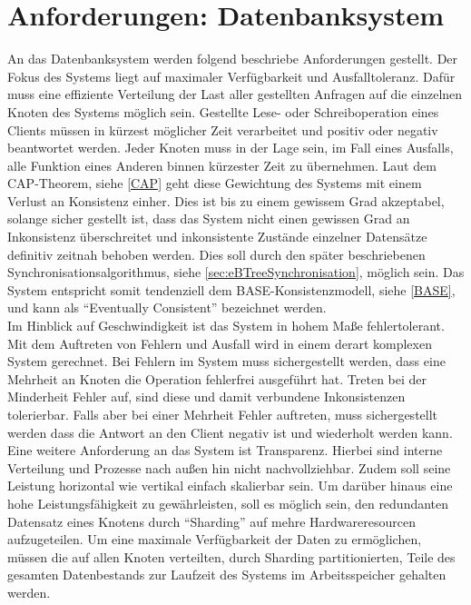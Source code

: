 \documentclass[a4paper,11pt,oneside,%
headsepline,												%
footsepline,												%
bibtotocnumbered									%
]{scrreprt}
\begin{document}
\section{Anforderungen: Datenbanksystem}
An das Datenbanksystem werden folgend beschriebe Anforderungen gestellt. Der Fokus des Systems liegt auf maximaler Verfügbarkeit und Ausfalltoleranz. Dafür muss eine effiziente Verteilung der Last aller gestellten Anfragen auf die einzelnen Knoten des Systems möglich sein. Gestellte Lese- oder Schreiboperation eines Clients müssen in kürzest möglicher Zeit verarbeitet und positiv oder negativ beantwortet werden. Jeder Knoten muss in der Lage sein, im Fall eines Ausfalls, alle Funktion eines Anderen binnen kürzester Zeit zu übernehmen. Laut dem CAP-Theorem, siehe \autoref{CAP} geht diese Gewichtung des Systems mit einem Verlust an Konsistenz einher. Dies ist bis zu einem gewissem Grad akzeptabel, solange sicher gestellt ist, dass das System nicht einen gewissen Grad an Inkonsistenz überschreitet und inkonsistente Zustände einzelner Datensätze definitiv zeitnah behoben werden. Dies soll durch den später beschriebenen Synchronisationsalgorithmus, siehe \autoref{sec:eBTreeSynchronisation}, möglich sein. Das System entspricht somit tendenziell dem BASE-Konsistenzmodell, siehe \autoref{BASE}, und kann als \enquote{Eventually Consistent} bezeichnet werden.\\ 

Im Hinblick auf Geschwindigkeit ist das System in hohem Maße fehlertolerant. Mit dem Auftreten von Fehlern und Ausfall wird in einem derart komplexen System gerechnet. Bei Fehlern im System muss sichergestellt werden, dass eine Mehrheit an Knoten die Operation fehlerfrei ausgeführt hat. Treten bei der Minderheit Fehler auf, sind diese und damit verbundene Inkonsistenzen tolerierbar. Falls aber bei einer Mehrheit Fehler auftreten, muss sichergestellt werden dass die Antwort an den Client negativ ist und  wiederholt werden kann. Eine weitere Anforderung an das System ist Transparenz. Hierbei sind interne Verteilung und Prozesse nach außen hin nicht nachvollziehbar. Zudem soll seine Leistung horizontal wie vertikal einfach skalierbar sein. Um darüber hinaus eine hohe Leistungsfähigkeit zu gewährleisten, soll es möglich sein, den redundanten Datensatz eines Knotens durch \enquote{Sharding} auf mehre Hardwareresourcen aufzugeteilen. Um eine maximale Verfügbarkeit der Daten zu ermöglichen, müssen die auf allen Knoten verteilten, durch Sharding partitionierten, Teile des gesamten Datenbestands zur Laufzeit des Systems im Arbeitsspeicher gehalten werden.
\end{document}
